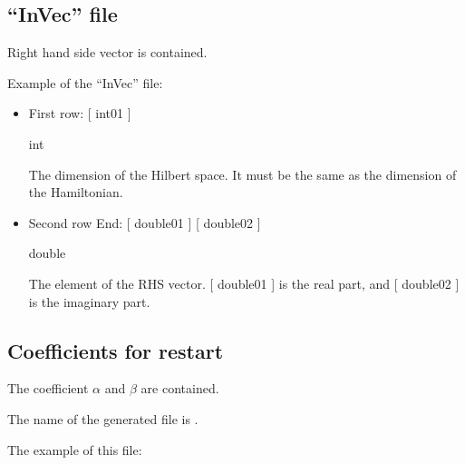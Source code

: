 \documentclass[letterpaper,10pt,dvipdfmx,openany,english]{sphinxmanual}
\begin{document}
\subsection{“InVec” file}
\label{\detokenize{shiftk_format_en:invec-file}}\label{\detokenize{shiftk_format_en:vec}}
Right hand side vector is contained.

Example of the “InVec” file:

\begin{sphinxVerbatim}[commandchars=\\\{\}]
 
 
\end{sphinxVerbatim}
\begin{itemize}
\item {} 
First row: {[} int01 {]}

 int

The dimension of the Hilbert space.
It must be the same as the dimension of the Hamiltonian.

\item {} 
Second row \sphinxhyphen{} End:
{[} double01 {]} {[} double02 {]}

 double

 The element of the RHS vector.
{[} double01 {]} is the real part,
and {[} double02 {]} is the imaginary part.

\end{itemize}


\subsection{Coefficients for restart}
\label{\detokenize{shiftk_format_en:coefficients-for-restart}}\label{\detokenize{shiftk_format_en:recoeff}}
The coefficient \(\alpha\) and \(\beta\)
are contained.

The name of the generated file is .

The example of this file:
\end{document}
